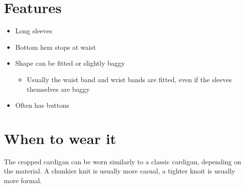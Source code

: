 \documentclass[
  openany]{book}
\providecommand{\tightlist}{%
  \setlength{\itemsep}{0pt}\setlength{\parskip}{0pt}}
\begin{document}
\hypertarget{features-1}{%
\section{Features}\label{features-1}}

\begin{itemize}
\tightlist
\item
  Long sleeves
\item
  Bottom hem stops at waist
\item
  Shape can be fitted or slightly baggy

  \begin{itemize}
  \tightlist
  \item
    Usually the waist band and wrist bands are fitted, even if the sleeves themselves are baggy
  \end{itemize}
\item
  Often has buttons
\end{itemize}

\hypertarget{when-to-wear-it-1}{%
\section{When to wear it}\label{when-to-wear-it-1}}

The cropped cardigan can be worn similarly to a classic cardigan, depending on the material. A chunkier knit is usually more casual, a tighter knoit is usually more formal.
\end{document}
